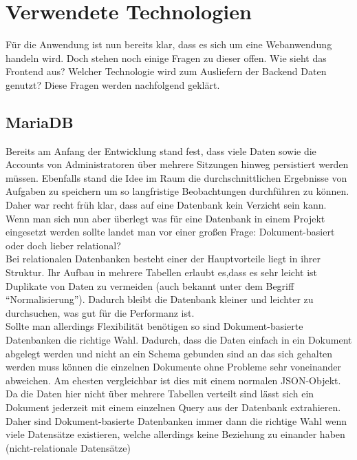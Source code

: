\section{Verwendete Technologien}

Für die Anwendung ist nun bereits klar, dass es sich um eine Webanwendung handeln wird. Doch stehen noch einige Fragen zu dieser offen. Wie sieht das Frontend aus? Welcher Technologie wird zum Ausliefern der Backend Daten genutzt? Diese Fragen werden nachfolgend geklärt.


\subsection{MariaDB}

Bereits am Anfang der Entwicklung stand fest, dass viele Daten sowie die Accounts von Administratoren über mehrere Sitzungen hinweg persistiert werden müssen. Ebenfalls stand die Idee im Raum die durchschnittlichen Ergebnisse von Aufgaben zu speichern um so langfristige Beobachtungen durchführen zu können. Daher war recht früh klar, dass auf eine Datenbank kein Verzicht sein kann. \\

Wenn man sich nun aber überlegt was für eine Datenbank in einem Projekt eingesetzt werden sollte landet man vor einer großen Frage: Dokument-basiert oder doch lieber relational? \\
Bei relationalen Datenbanken besteht einer der Hauptvorteile liegt in ihrer Struktur. Ihr Aufbau in mehrere Tabellen erlaubt es,dass es sehr leicht ist Duplikate von Daten zu vermeiden (auch bekannt unter dem Begriff ``Normalisierung''). Dadurch bleibt die Datenbank kleiner und leichter zu durchsuchen, was gut für die Performanz ist. \\

Sollte man allerdings Flexibilität benötigen so sind Dokument-basierte Datenbanken die richtige Wahl. Dadurch, dass die Daten einfach in ein Dokument abgelegt werden und nicht an ein Schema gebunden sind an das sich gehalten werden muss können die einzelnen Dokumente ohne Probleme sehr voneinander abweichen. Am ehesten vergleichbar ist dies mit einem normalen JSON-Objekt. Da die Daten hier nicht über mehrere Tabellen verteilt sind lässt sich ein Dokument jederzeit mit einem einzelnen Query aus der Datenbank extrahieren. Daher sind Dokument-basierte Datenbanken immer dann die richtige Wahl wenn viele Datensätze existieren, welche allerdings keine Beziehung zu einander haben (nicht-relationale Datensätze) \\

